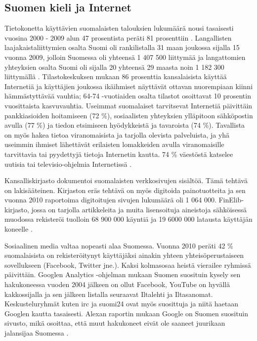 \documentclass[]{../../metanetpaper}
\begin{document}
\begin{multicols}{2}
\subsection{Suomen kieli ja Internet}


Tietokonetta käyttävien suomalaisten talouksien lukumäärä nousi
tasaisesti vuosina 2000 - 2009 alun 47 prosentista peräti 81
prosenttiin \cite{OECD-ICT}. Langallisten laajakaistaliittymien osalta
Suomi oli rankilistalla 31 maan joukossa sijalla 15 vuonna 2009,
jolloin Suomessa oli yhteensä 1 407 500 liittymää \cite{OECD-wired} ja
langattomien yhteyksien osalta Suomi oli sijalla 20 yhteensä 29 maasta
noin 1 182 300 liittymällä \cite{OECD-mobile}. Tilastokeskuksen mukaan
86 prosenttia kansalaisista käyttää Internetiä ja käyttäjien joukossa
ikäihmiset näyttävät ottavan nuorempiaan kiinni hämmästyttävää
vauhtia; 64-74 -vuotiaiden osalta tilastot osoittavat 10 prosentin
vuosittaista kasvuvauhtia. Useimmat suomalaiset tarvitsevat Internetiä
päivittäin pankkiasioiden hoitamiseen (72 \%), sosiaalisten
yhteyksien ylläpitoon sähköpostin avulla (77 \%) ja tiedon
etsimiseen hyödykkeistä ja tavaroista (74 \%). Tavallista on
myös hakea tietoa viranomaisista ja tarjolla olevista palveluista, ja
yhä useimmin ihmiset lähettävät erilaisten lomakkeiden avulla
viranomaisille tarvittavia tai pyydettyjä tietoja Internetin
kautta. 74 \% väestöstä katselee uutisia tai televisio-ohjelmia Internetissä \cite{SVT}.

Kansalliskirjasto dokumentoi suomalaisten verkkosivujen sisältöä. Tämä
tehtävä on lakisääteinen. Kirjaston eräs tehtävä on myös digitoida
painotuotteita ja sen vuonna 2010 raportoima digitoitujen sivujen
lukumäärä oli 1 064 000.  FinElib-kirjasto, jossa on tarjolla
artikkeleita ja muita lisensoituja aineistoja sähköisessä muodossa
rekisteröi tuolloin 68 900 000 käyntiä ja 19 6000 000 latausta
käyttäjän koneelle \cite{natlibstat}.

Sosiaalinen media valtaa nopeasti alaa Suomessa. Vuonna 2010 peräti 42
\% suomalaisista on rekisteröitynyt käyttäjäksi ainakin yhteen
yhteisöperustaiseen sovellukseen (Facebook, Twitter jne.). Kaksi
kolmasosaa heistä vierailee ryhmissä päivittäin. Googlen Analytics
-ohjelman mukaan Suomen suosituin kysely sen hakukoneessa vuoden 2004
jälkeen on ollut Facebook, YouTube on hyvällä kakkossijalla ja sen
jälkeen listalla seuraavat Iltalehti ja Iltasanomat. Keskusteluryhmät
kuten irc ja suomi24 ovat myös suosittuja ja niitä haetaan Googlen
kautta tasaisesti. Alexan raportin mukaan Google on Suomen suosituin
sivusto, mikä osoittaa, että muut hakukoneet eivät ole saaneet
juurikaan jalansijaa Suomessa \cite{topsites}.


\end{multicols}
\end{document}
